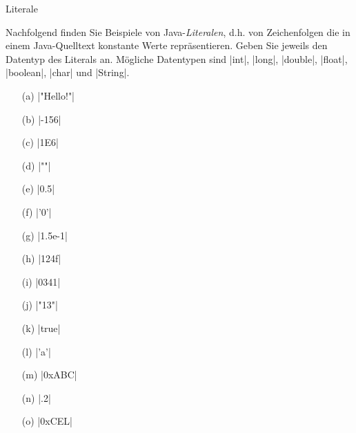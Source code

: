 \begin{exercise}{Literale}

\begin{body}
Nachfolgend finden Sie Beispiele von Java-\emph{Literalen}, d.h. von Zeichenfolgen die in einem Java-Quelltext konstante Werte repräsentieren. Geben Sie jeweils den Datentyp des Literals an. Mögliche Datentypen sind
\code|int|, \code|long|, \code|double|, \code|float|, \code|boolean|, \code|char| und \code|String|.
\begin{center}
\begin{minipage}{0.3\textwidth}
\begin{itemize}
\item[(a)] \code|"Hello!"|
\item[(b)] \code|-156|
\item[(c)] \code|1E6|
\item[(d)] \code|""|
\item[(e)] \code|0.5|
\end{itemize}
\end{minipage}
\begin{minipage}{0.3\textwidth}
\begin{itemize}
\item[(f)] \code|'0'|
\item[(g)] \code|1.5e-1|
\item[(h)] \code|124f|
\item[(i)] \code|0341|
\item[(j)] \code|"13"|
\end{itemize}
\end{minipage}
\begin{minipage}{0.3\textwidth}
\begin{itemize}
\item[(k)] \code|true|
\item[(l)] \code|'a'|
\item[(m)] \code|0xABC|
\item[(n)] \code|.2|
\item[(o)] \code|0xCEL|
\end{itemize}
\end{minipage}
\end{center}
\end{body}


\end{exercise}
